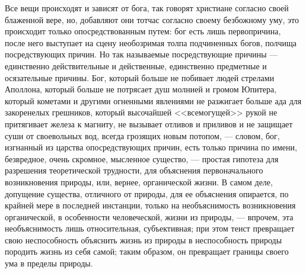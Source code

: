 \documentclass[12pt,oneside]{book}
\begin{document}
Все вещи происходят и зависят от бога, так говорят христиане согласно своей блаженной вере, но, добавляют они тотчас согласно своему безбожному уму, это происходит только опосредствованным путем: бог есть лишь первопричина, после него выступает на сцену необозримая толпа подчиненных богов, полчища посредствующих причин. Но так называемые посредствующие причины --- единственно действительные и действенные, единственно предметные и осязательные причины. Бог, который больше не побивает людей стрелами Аполлона, который больше не потрясает душ молнией и громом Юпитера, который кометами и другими огненными явлениями не разжигает больше ада для закоренелых грешников, который высочайшей <<всемогущей>> рукой не притягивает железа к магниту, не вызывает отливов и приливов и не защищает суши от своевольных вод, всегда грозящих новым потопом, --- словом, бог, изгнанный из царства опосредствующих причин, есть только причина по имени, безвредное, очень скромное, мысленное существо, --- простая гипотеза для разрешения теоретической трудности, для объяснения первоначального возникновения природы, или, вернее, органической жизни. В самом деле, допущение существа, отличного от природы, для ее объяснения опирается, по крайней мере в последней инстанции, только на необъяснимость возникновения органической, в особенности человеческой, жизни из природы, --- впрочем, эта необъяснимость лишь относительная, субъективная; при этом теист превращает свою неспособность объяснить жизнь из природы в неспособность природы породить жизнь из себя самой; таким образом, он превращает границы своего ума в пределы природы.



\chapter{}
\end{document}
